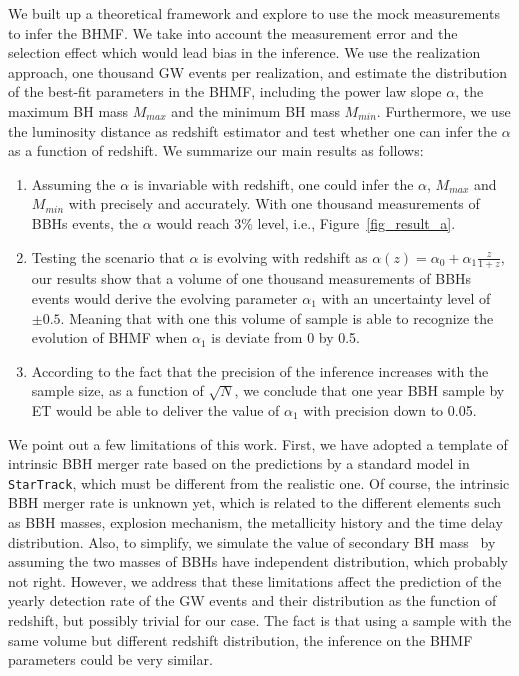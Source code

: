 \documentclass[twocolumn]{aastex62}
\begin{document}
We built up a theoretical framework and explore to use the mock measurements to infer the BHMF. We take into account the measurement error and the selection effect which would lead bias in the inference. We use the realization approach, one thousand GW events per realization, and estimate the distribution of the best-fit parameters in the BHMF, including the power law slope $\alpha$, the maximum BH mass $M_{max}$ and the minimum BH mass $M_{min}$. Furthermore, we use the luminosity distance as redshift estimator and test whether one can infer the $\alpha$ as a function of redshift. We summarize our main results as follows:
\begin{enumerate}
\item Assuming the $\alpha$ is invariable with redshift, one could infer the $\alpha$, $M_{max}$ and $M_{min}$ with precisely and accurately. With one thousand measurements of BBHs events, the $\alpha$ would reach 3\% level, i.e., Figure~\ref{fig_result_a}.
\item Testing the scenario that $\alpha$ is evolving with redshift as $\alpha(z) = \alpha_0 + \alpha_1\frac{z}{1+z}$, our results show that a volume of one thousand measurements of BBHs events would derive the evolving parameter $\alpha_1$ with an uncertainty level of $\pm0.5$. Meaning that with one this volume of sample is able to recognize the evolution of BHMF when $\alpha_1$ is deviate from $0$ by 0.5.
\item According to the fact that the precision of the inference increases with the sample size, as a function of $\sqrt{N}$, we conclude that one year BBH sample by ET would be able to deliver the value of $\alpha_1$ with precision down to 0.05.
\end{enumerate}

We point out a few limitations of this work. First, we have adopted a template of intrinsic BBH merger rate based on the predictions by a standard model in {\tt StarTrack}, which must be different from the realistic one. Of course, the intrinsic BBH merger rate is unknown yet, which is related to the different elements such as BBH masses, explosion mechanism, the metallicity history and the time delay distribution. Also, to simplify, we simulate the value of secondary BH mass \mtwo\ by assuming the two masses of BBHs have independent distribution, which probably not right. However, we address that these limitations affect the prediction of the yearly detection rate of the GW events and their distribution as the function of redshift, but possibly trivial for our case. The fact is that using a sample with the same volume but different redshift distribution, the inference on the BHMF parameters could be very similar. 
\end{document}
